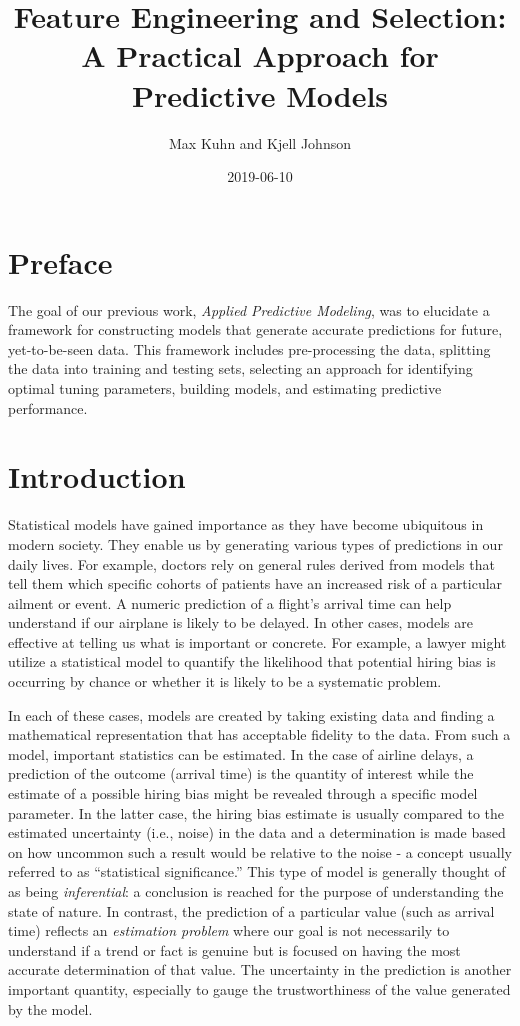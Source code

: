 \documentclass[11pt]{book}
\title{Feature Engineering and Selection: A Practical Approach for Predictive Models}
\author{Max Kuhn and Kjell Johnson}
\date{2019-06-10}
\begin{document}
\maketitle

{
\hypersetup{linkcolor=}
\setcounter{tocdepth}{1}
\tableofcontents
}
\hypertarget{preface}{%
\chapter*{Preface}\label{preface}}


The goal of our previous work, \emph{Applied Predictive Modeling}, was to elucidate a framework for constructing models that generate accurate predictions for future, yet-to-be-seen data. This framework includes pre-processing the data, splitting the data into training and testing sets, selecting an approach for identifying optimal tuning parameters, building models, and estimating predictive performance.\\
\mainmatter

\hypertarget{intro-intro}{%
\chapter{Introduction}\label{intro-intro}}

Statistical models have gained importance as they have become ubiquitous in modern society. They enable us by generating various types of predictions in our daily lives. For example, doctors rely on general rules derived from models that tell them which specific cohorts of patients have an increased risk of a particular ailment or event. A numeric prediction of a flight's arrival time can help understand if our airplane is likely to be delayed. In other cases, models are effective at telling us what is important or concrete. For example, a lawyer might utilize a statistical model to quantify the likelihood that potential hiring bias is occurring by chance or whether it is likely to be a systematic problem.

In each of these cases, models are created by taking existing data and finding a mathematical representation that has acceptable fidelity to the data. From such a model, important statistics can be estimated. In the case of airline delays, a prediction of the outcome (arrival time) is the quantity of interest while the estimate of a possible hiring bias might be revealed through a specific model parameter. In the latter case, the hiring bias estimate is usually compared to the estimated uncertainty (i.e., noise) in the data and a determination is made based on how uncommon such a result would be relative to the noise - a concept usually referred to as ``statistical significance.'' This type of model is generally thought of as being \emph{inferential}: a conclusion is reached for the purpose of understanding the state of nature. In contrast, the prediction of a particular value (such as arrival time) reflects an \emph{estimation problem} where our goal is not necessarily to understand if a trend or fact is genuine but is focused on having the most accurate determination of that value. The uncertainty in the prediction is another important quantity, especially to gauge the trustworthiness of the value generated by the model.
\end{document}
